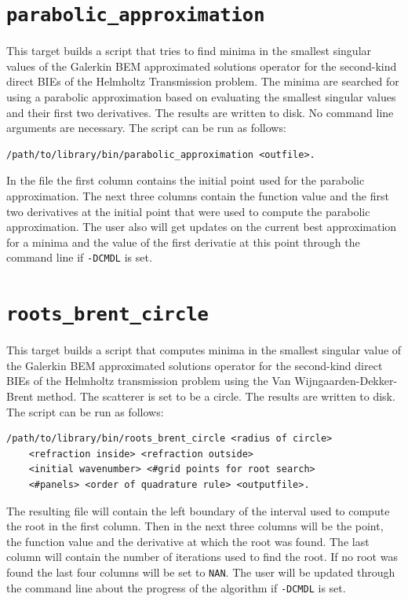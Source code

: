 \documentclass[a4paper, oneside]{discothesis}
\begin{document}
\cprotect\section{\verb|parabolic_approximation|}
This target builds a script that tries to find minima in the smallest singular values
of the Galerkin BEM approximated solutions operator for the second-kind direct BIEs of 
the Helmholtz Transmission problem.
The minima are searched for using a parabolic approximation
based on evaluating the smallest singular values and their first
two derivatives.
The results are written to disk.
No command line arguments are necessary.
The script can be run as follows:
\begin{verbatim}
/path/to/library/bin/parabolic_approximation <outfile>.
\end{verbatim}
In the file the first column contains the initial point used for the parabolic approximation.
The next three columns contain the function value and the first two derivatives at the initial point that were used to compute the parabolic approximation.
The user also will get updates on the current best approximation for a minima and the value of the first derivatie at this point through the command line if \verb|-DCMDL| is set.

\cprotect\section{\verb|roots_brent_circle|}
This target builds a script that computes minima in the smallest singular value of the
Galerkin BEM approximated solutions operator for the second-kind direct BIEs of the Helmholtz
transmission problem using the Van Wijngaarden-Dekker-Brent method.
The scatterer is set to be a circle.
The results are written to disk.
The script can be run as follows:
\begin{verbatim}
/path/to/library/bin/roots_brent_circle <radius of circle> 
	<refraction inside> <refraction outside> 
	<initial wavenumber> <#grid points for root search> 
	<#panels> <order of quadrature rule> <outputfile>.
\end{verbatim}
The resulting file will contain the left boundary of the interval used to compute the root in the first column. 
Then in the next three columns will be the point, the function value and the derivative at which the root was found.
The last column will contain the number of iterations used to find the root.
If no root was found the last four columns will be set to \verb|NAN|.
The user will be updated through the command line about the progress of the algorithm if \verb|-DCMDL| is set.
\end{document}
